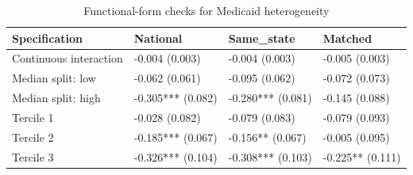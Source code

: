 \begin{table}
\caption{Functional-form checks for Medicaid heterogeneity}
\begin{tabular}{llll}
\toprule
Specification & National & Same_state & Matched \\
\midrule
Continuous interaction & -0.004 (0.003) & -0.004 (0.003) & -0.005 (0.003) \\
Median split: low & -0.062 (0.061) & -0.095 (0.062) & -0.072 (0.073) \\
Median split: high & -0.305*** (0.082) & -0.280*** (0.081) & -0.145 (0.088) \\
Tercile 1 & -0.028 (0.082) & -0.079 (0.083) & -0.079 (0.093) \\
Tercile 2 & -0.185*** (0.067) & -0.156** (0.067) & -0.005 (0.095) \\
Tercile 3 & -0.326*** (0.104) & -0.308*** (0.103) & -0.225** (0.111) \\
\bottomrule
\end{tabular}
\end{table}
